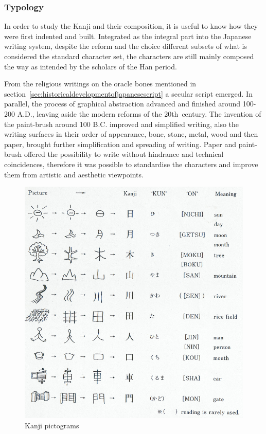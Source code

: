 \subsubsection{Typology}
\label{sec:typologyoftheKanji}

In order to study the Kanji and their composition, it is useful to know how they
were first indented and built. Integrated as the integral part into the Japanese
writing system, despite the reform and the choice different subsets of what is 
considered the standard character set, the characters are still mainly composed
the way as intended by the scholars of the Han period.

From the religious writings on the oracle bones mentioned in 
section~\ref{sec:historicaldevelopmentofjapanesescript} a secular script 
emerged. In parallel, the process of graphical abstraction advanced and
finished around 100-200 A.D., leaving aside the modern reforms of the 
20th~century. The invention of the paint-brush around 100 B.C. improved and 
simplified writing, also the writing surfaces in their order of appearance,
bone, stone, metal, wood and then paper, brought further simplification and
spreading of writing. Paper and paint-brush offered the possibility to write
without hindrance and technical coincidences, therefore it was possible to
standardise the characters and improve them from artistic and aesthetic 
viewpoints.

\begin{figure}[htbp]
\begin{center}
\includegraphics[scale=0.4]{images/Kanjipictograms.png}
\caption{Kanji pictograms}
\label{fig:Kanjipictograms}
\end{center}
\end{figure}

